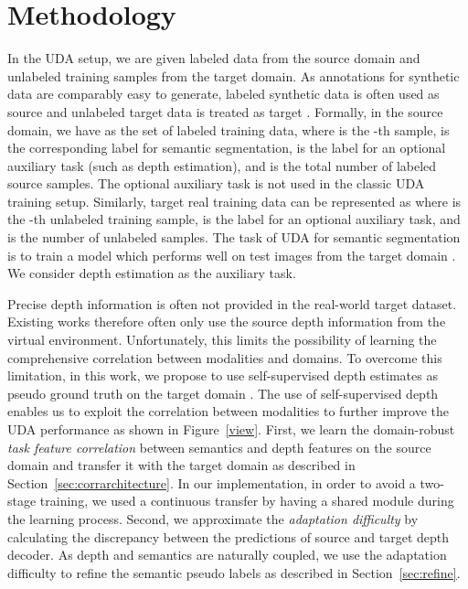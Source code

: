 \documentclass[10pt,twocolumn,letterpaper]{article}
\begin{document}
\section{Methodology}
In the UDA setup, we are given labeled data from the source domain and unlabeled training samples from the target domain. As annotations for synthetic data are comparably easy to generate, labeled synthetic data is often used as source  and unlabeled target data is treated as target . Formally, in the source domain, we have  as the set of labeled training data, where  is the -th sample,  is the corresponding label for semantic segmentation,  is the label for an optional auxiliary task (such as depth estimation), and  is the total number of labeled source samples. The optional auxiliary task is not used in the classic UDA training setup. Similarly, target real training data can be represented as  where  is the -th unlabeled training sample,  is the label for an optional auxiliary task, and  is the number of unlabeled samples. The task of UDA for semantic segmentation is to train a model which performs well on test images  from the target domain . We consider depth estimation as the auxiliary task.

Precise depth information is often not provided in the real-world target dataset. Existing works therefore often only use the source depth information from the virtual environment. Unfortunately, this limits the possibility of learning the comprehensive correlation between modalities and domains. To overcome this limitation, in this work, we propose to use self-supervised depth estimates as pseudo ground truth on the target domain . The use of self-supervised depth enables us to exploit the correlation between modalities to further improve the UDA performance as shown in Figure~\ref{view}.
First, we learn the domain-robust \textit{task feature correlation} between semantics and depth features on the source domain and transfer it with the target domain as described in Section~\ref{sec:corrarchitecture}. In our implementation, in order to avoid a two-stage training, we used a continuous transfer by having a shared module during the learning process. Second, we approximate the \textit{adaptation difficulty} by calculating the discrepancy between the predictions of source and target depth decoder. As depth and semantics are naturally coupled, we use the adaptation difficulty to refine the semantic pseudo labels as described in Section~\ref{sec:refine}.
\end{document}
